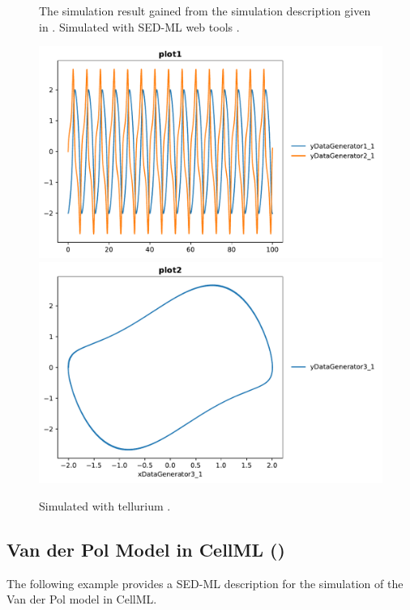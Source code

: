 \begin{figure}[ht]
\begin{minipage}{0.47\textwidth}
        \caption{The simulation result gained from the simulation description given in . Simulated with SED-ML web tools \citep{bergmann2017sed}.}
    \end{minipage}\hfill
    \begin{minipage}{0.47\textwidth}
        \centering
        \includegraphics[width=1.0\textwidth]{examples/vanderpol-sbml/results/tellurium/plot1}
        \includegraphics[width=1.0\textwidth]{examples/vanderpol-sbml/results/tellurium/plot2}
        \caption{Simulated with tellurium \citep{tellurium}.}
    \end{minipage}
    \label{fig:lorenz-sbml}
\end{figure}


\subsection{Van der Pol Model in CellML ()}
\label{example:vanderpol_cellml}
The following example provides a SED-ML description for the simulation of the Van der Pol model in CellML.


